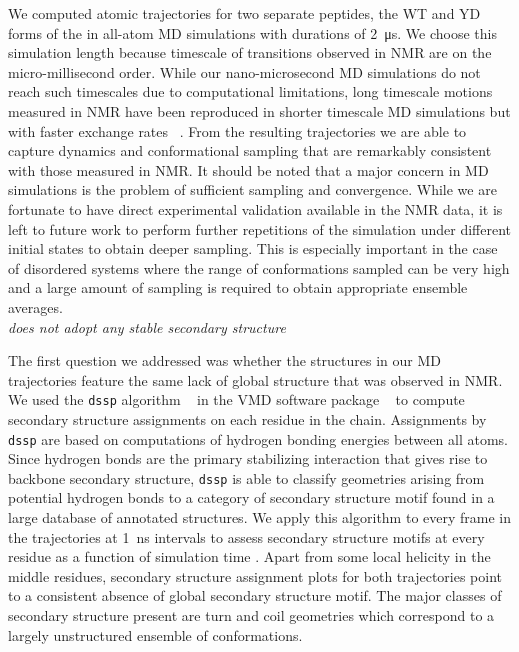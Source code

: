 We computed atomic trajectories for two separate peptides, the WT and YD forms of the \gct in all-atom MD simulations with durations of \SI{2}{\us}. We choose this simulation length because timescale of transitions observed in NMR are on the micro-millisecond order. While our nano-microsecond MD simulations do not reach such timescales due to computational limitations, long timescale motions measured in NMR have been reproduced in shorter timescale MD simulations but with faster exchange rates ~\cite{massi2004nmr, stafford2015conformational, henzler2007dynamic}. From the resulting trajectories we are able to capture dynamics and conformational sampling that are remarkably consistent with those measured in NMR. It should be noted that a major concern in MD simulations is the problem of sufficient sampling and convergence. While we are fortunate to have direct experimental validation available in the NMR data, it is left to future work to perform further repetitions of the simulation under different initial states to obtain deeper sampling. This is especially important in the case of disordered systems where the range of conformations sampled can be very high and a large amount of sampling is required to obtain appropriate ensemble averages.\\

{\it \gct does not adopt any stable secondary structure}

The first question we addressed was whether the structures in our MD trajectories feature the same lack of global structure that was observed in NMR. We used the \texttt{dssp} algorithm ~\cite{kabsch1983dictionary} in the VMD software package ~\cite{humphrey1996vmd} to compute secondary structure assignments on each residue in the chain. Assignments by \texttt{dssp} are based on computations of hydrogen bonding energies between all atoms. Since hydrogen bonds are the primary stabilizing interaction that gives rise to backbone secondary structure, \texttt{dssp} is able to classify geometries arising from potential hydrogen bonds to a category of secondary structure motif found in a large database of annotated structures. We apply this algorithm to every frame in the trajectories at \SI{1}{\ns} intervals to assess secondary structure motifs at every residue as a function of simulation time . Apart from some local helicity in the middle residues, secondary structure assignment plots for both trajectories point to a consistent absence of global secondary structure motif. The major classes of secondary structure present are turn and coil geometries which correspond to a largely unstructured ensemble of conformations. 

